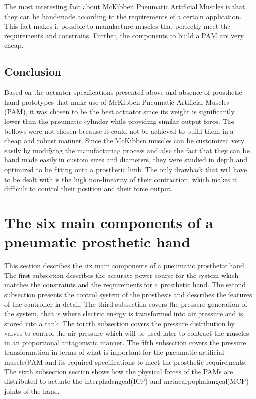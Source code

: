 \documentclass[main]{subfiles}
\begin{document}
The most interesting fact about McKibben Pneumatic Artificial Muscles is that they can be hand-made according to the requirements of a certain application. This fact makes it possible to manufacture muscles that perfectly meet the requirements and constrains. Further, the components to build a PAM are very cheap.

\subsection{Conclusion}

Based on the actuator specifications presented above and absence of prosthetic hand prototypes that make use of McKibben Pneumatic Artificial Muscles (PAM), it was chosen to be the best actuator since its weight is significantly lower than the pneumatic cylinder while providing similar output force. The bellows were not chosen because it could not be achieved to build them in a cheap and robust manner. Since the McKibben muscles can be customized very easily by modifying the manufacturing process and also the fact that they can be hand made easily in custom sizes and diameters, they were studied in depth and optimized to be fitting onto a prosthetic limb. The only drawback that will have to be dealt with is the high non-linearity of their contraction, which makes it difficult to control their position and their force output.

\section{The six main components of a pneumatic prosthetic hand}

This section describes the six main components of a pneumatic prosthetic hand. The first subsection describes the accurate power source for the system which matches the constraints and the requirements for a prosthetic hand. The second subsection presents the control system of the prosthesis and describes the features of the controller in detail. The third subsection covers the pressure generation of the system, that is where electric energy is transformed into air pressure and is stored into a tank. The fourth subsection covers the pressure distribution by valves to control the air pressure which will be used later to contract the muscles in an proportional antagonistic manner. The fifth subsection covers the pressure transformation in terms of what is important for the pneumatic artificial muscle(PAM and its required specifications to meet the prosthetic requirements. The sixth subsection section shows how the physical forces of the PAMs are distributed to actuate the  interphalangeal(ICP) and metacarpophalangeal(MCP) joints of the hand.
\end{document}
